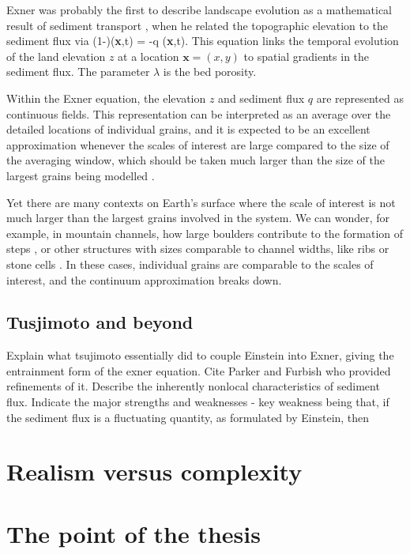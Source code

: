 Exner was probably the first to describe landscape evolution as a mathematical result of sediment transport \citep{Exner1925}, when he related the topographic elevation to the sediment flux via
\be (1-\lambda)(\textbf{x},t) = -\nabla q (\textbf{x},t). \ee
This equation links the temporal evolution of the land elevation $z$ at a location $\textbf{x}=(x,y)$ to spatial gradients in the sediment flux. The parameter $\lambda$ is the bed porosity.

Within the Exner equation, the elevation $z$ and sediment flux $q$ are represented as continuous fields. This representation can be interpreted as an average over the detailed locations of individual grains, and it is expected to be an excellent approximation whenever the scales of interest are large compared to the size of the averaging window, which should be taken much larger than the size of the largest grains being modelled \citep{Coleman2009}. 

Yet there are many contexts on Earth's surface where the scale of interest is not much larger than the largest grains involved in the system. We can wonder, for example, in mountain channels, how large boulders contribute to the formation of steps \citep{Zimmerman2008,Saletti2020}, or other structures with sizes comparable to channel widths, like ribs or stone cells \citep{Hassan2008,Venditti2017}. In these cases, individual grains are comparable to the scales of interest, and the continuum approximation breaks down.  


\subsection{Tusjimoto and beyond}
Explain what tsujimoto essentially did to couple Einstein into Exner, giving the entrainment form of the exner equation.
Cite Parker and Furbish who provided refinements of it.
Describe the inherently nonlocal characteristics of sediment flux.
Indicate the major strengths and weaknesses -  key weakness being that, if the sediment flux is a fluctuating quantity, as formulated by Einstein, then 

\section{Realism versus complexity}

\section{The point of the thesis} 

